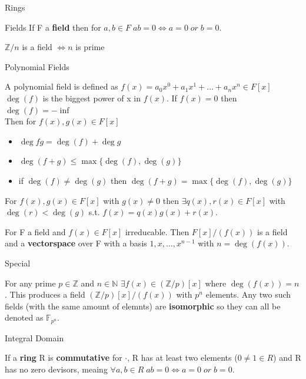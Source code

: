 \documentclass[12pt, letterpaper]{article}
\begin{document}
\begin{section}{Rings}
\begin{subsection}{Fields}
    If F a \textbf{field} then for \(a, b \in F \; ab = 0 \iff a = 0 \; or \; b = 0\).

    \(\mathbb{Z}/n\) is a field \(\iff n\) is prime

    \begin{subsubsection}{Polynomial Fields}

      A polynomial field is defined as
      \(f(x) = a_{0}x^{0} + a_{1}x^{1} + \dots + a_{n}x^{n} \in F[x]\) \\
      \(\deg(f)\) is the biggest power of x in \(f(x)\). If \(f(x) = 0\) then
      \(\deg(f) = -\inf\) \\
      Then for \(f(x), g(x) \in F[x]\)
      \begin{itemize}
        \item \(\deg{fg} = \deg(f) + \deg{g}\)
        \item \(\deg(f + g) \leq \max\{ \deg(f), \deg(g) \}\)
        \item if \(\deg(f) \neq \deg(g)\) then \(\deg(f + g) = \max\{ \deg(f), \deg(g) \}\)
      \end{itemize}

      For \(f(x), g(x) \in F[x]\) with \(g(x) \neq 0\) then \(\exists q(x), r(x) \in F[x]\)
      with \(\deg(r) < \deg(g)\) s.t. \(f(x) = q(x)g(x) + r(x)\).

      For F a field and \(f(x) \in F[x]\) irreducable. Then \(F[x]/(f(x))\) is a field
      and a \textbf{vectorspace} over F with a basis \(1, x, \dots , x^{n - 1}\)
      with \(n = \deg(f(x))\).

    \end{subsubsection}

    \begin{subsubsection}{Special}

      For any prime \(p \in \mathbb{Z}\) and \(n \in \mathbb{N}\)
      \(\exists f(x) \in (\mathbb{Z} / p)[x]\) where \(\deg(f(x)) = n\).
      This produces a field \((\mathbb{Z} / p)[x] / (f(x))\) with \(p^{n}\)
      elements. Any two such fields (with the same amount of elemnts) are \textbf{isomorphic}
      so they can all be denoted as \(\mathbb{F}_{p^{n}}\).

    \end{subsubsection}

  \end{subsection}

  \begin{subsection}{Integral Domain}

    If a  \textbf{ring} R is \textbf{commutative} for \(\cdot\), R has at least
    two elements (\(0 \neq 1 \in R\)) and R has no zero devisors, meaing
    \(\forall a, b \in R \; ab = 0 \iff a = 0 \; or \; b = 0\).


\end{subsection}
\end{section}
\end{document}
